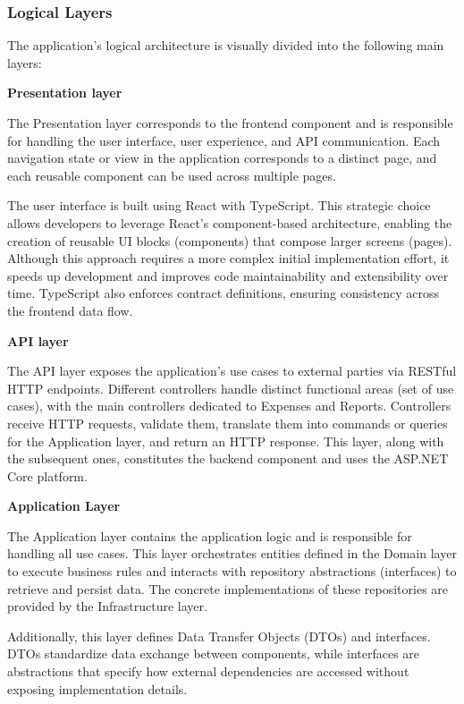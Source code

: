 \subsubsection{Logical Layers}

The application's logical architecture is visually divided into the following main layers:	

\textbf{Presentation layer}

The Presentation layer corresponds to the frontend component and is responsible for handling the user interface, user experience, and API communication. Each navigation state or view in the application corresponds to a distinct page, and each reusable component can be used across multiple pages.

The user interface is built using React with TypeScript. This strategic choice allows developers to leverage React's component-based architecture, enabling the creation of reusable UI blocks (components) that compose larger screens (pages). Although this approach requires a more complex initial implementation effort, it speeds up development and improves code maintainability and extensibility over time. TypeScript also enforces contract definitions, ensuring consistency across the frontend data flow. 

\textbf{API layer}

The API layer exposes the application's use cases to external parties via RESTful HTTP endpoints. Different controllers handle distinct functional areas (set of use cases), with the main controllers dedicated to Expenses and Reports. Controllers receive HTTP requests, validate them, translate them into commands or queries for the Application layer, and return an HTTP response. This layer, along with the subsequent ones, constitutes the backend component and uses the ASP.NET Core platform.

\vspace{1cm}

\textbf{Application Layer}

The Application layer contains the application logic and is responsible for handling all use cases. This layer orchestrates entities defined in the Domain layer to execute business rules and interacts with repository abstractions (interfaces) to retrieve and persist data. The concrete implementations of these repositories are provided by the Infrastructure layer.


Additionally, this layer defines Data Transfer Objects (DTOs) and interfaces. DTOs standardize data exchange between components, while interfaces are abstractions that specify how external dependencies are accessed without exposing implementation details.

